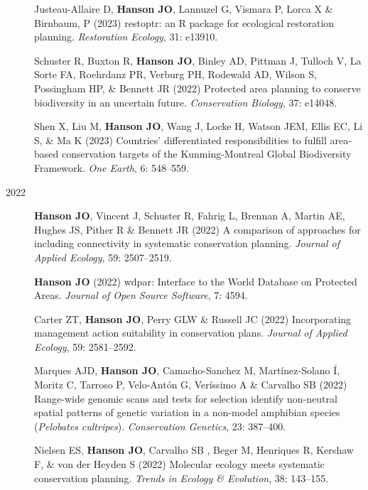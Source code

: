 \documentclass[12pt,a4paper]{article}
\begin{document}
\begin{description}
\item[] Justeau-Allaire D, \textbf{Hanson JO}, Lannuzel G, Vismara P, Lorca X \& Birnbaum, P (2023) restoptr: an R package for ecological restoration planning. \textit{Restoration Ecology}, 31: e13910.

\item[] Schuster R, Buxton R, \textbf{Hanson JO}, Binley AD, Pittman J, Tulloch V, La Sorte FA, Roehrdanz PR, Verburg PH, Rodewald AD, Wilson S, Possingham HP, \& Bennett JR (2022) Protected area planning to conserve biodiversity in an uncertain future. \textit{Conservation Biology}, 37: e14048.

\item[] Shen X, Liu M, \textbf{Hanson JO}, Wang J, Locke H, Watson JEM, Ellis EC, Li S, \& Ma K (2023) Countries' differentiated responsibilities to fulfill area-based conservation targets of the Kunming-Montreal Global Biodiversity Framework. \textit{One Earth}, 6: 548--559.

\item[2022] \textbf{Hanson JO}, Vincent J, Schuster R, Fahrig L, Brennan A, Martin AE, Hughes JS, Pither R \& Bennett JR (2022) A comparison of approaches for including connectivity in systematic conservation planning. \textit{Journal of Applied Ecology}, 59: 2507--2519.

\item [] \textbf{Hanson JO} (2022) wdpar: Interface to the World Database on Protected Areas. \textit{Journal of Open Source Software}, 7: 4594.

\item [] Carter ZT, \textbf{Hanson JO}, Perry GLW \& Russell JC (2022) Incorporating management action suitability in conservation plans. \textit{Journal of Applied Ecology}, 59: 2581--2592.

\item[] Marques AJD, \textbf{Hanson JO}, Camacho-Sanchez M, Martínez‐Solano Í, Moritz C, Tarroso P, Velo‐Antón G, Veríssimo A \& Carvalho SB (2022) Range-wide genomic scans and tests for selection identify non-neutral spatial patterns of genetic variation in a non-model amphibian species (\textit{Pelobates cultripes}). \textit{Conservation Genetics}, 23: 387--400.

\item[] Nielsen ES, \textbf{Hanson JO}, Carvalho SB , Beger M, Henriques R, Kershaw F, \& von der Heyden S (2022) Molecular ecology meets systematic conservation planning. \textit{Trends in Ecology \& Evolution}, 38: 143--155.


\end{description}
\end{document}
